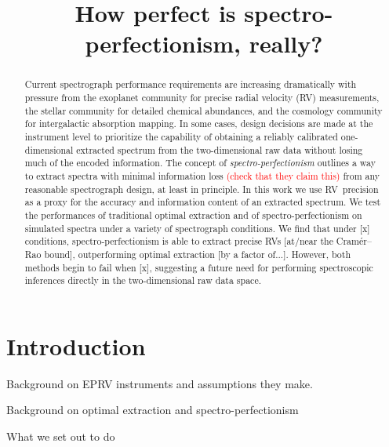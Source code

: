 \documentclass[modern]{aastex61}
\newcommand{\todo}[1]{\textcolor{red}{#1}}  %
\newcommand{\acronym}[1]{{\small{#1}}}
\newcommand{\RV}{\acronym{RV}}
\begin{document}
\sloppy\sloppypar\raggedbottom\frenchspacing %
\graphicspath{ {figures/} }

\title{How perfect is spectro-perfectionism, really?}

\begin{abstract}\noindent
Current spectrograph performance requirements are increasing dramatically with pressure from the exoplanet community for precise radial velocity (\RV) measurements, the stellar community for detailed chemical abundances, and the cosmology community for intergalactic absorption mapping. 
In some cases, design decisions are made at the instrument level to prioritize the capability of obtaining a reliably calibrated one-dimensional extracted spectrum from the two-dimensional raw data without losing much of the encoded information. 
The concept of \textsl{spectro-perfectionism} outlines a way to extract spectra with minimal information loss \todo{(check that they claim this)} from any reasonable spectrograph design, at least in principle. 
In this work we use \RV\ precision as a proxy for the accuracy and information content of an extracted spectrum. 
We test the performances of traditional optimal extraction and of spectro-perfectionism on simulated spectra under a variety of spectrograph conditions. 
We find that under [x] conditions, spectro-perfectionism is able to extract precise \RV s [at/near the Cram\'er--Rao bound], outperforming optimal extraction [by a factor of...]. 
However, both methods begin to fail when [x], suggesting a future need for performing spectroscopic inferences directly in the two-dimensional raw data space.
\end{abstract}

\section{Introduction}

Background on EPRV instruments and assumptions they make.

Background on optimal extraction and spectro-perfectionism

What we set out to do
\end{document}

